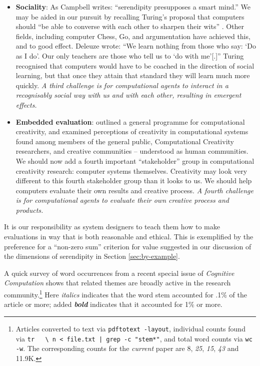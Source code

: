 \begin{itemize}
\item \textbf{Sociality}: As Campbell \citeyear{campbell} writes:
  ``serendipity presupposes a smart mind.''  We may be aided in our
  pursuit by recalling Turing's proposal that computers should ``be
  able to converse with each other to sharpen their wits''
  \cite{turing-intelligent}.  Other fields, including computer Chess,
  Go, and argumentation have achieved this, and to good effect.
  Deleuze \citeyear[p. 26]{deleuze1994difference} wrote: ``We learn
  nothing from those who say: `Do as I do'. Our only teachers are
  those who tell us to `do with me'[.]''  Turing recognised that
  computers would have to be coached in the direction of social
  learning, but that once they attain that standard they will learn
  much more quickly.  \emph{A third challenge is for computational
    agents to interact in a recognisably social way with us and with
    each other, resulting in emergent effects.}
\end{itemize}

\begin{itemize}
\item \textbf{Embedded evaluation}:
   outlined a general programme
  for computational creativity, and examined perceptions of creativity
  in computational systems found among members of the general public,
  Computational Creativity researchers, and creative communities --
  understood as human communities.  We should now add a fourth
  important ``stakeholder'' group in computational creativity
  research: computer systems themselves.  Creativity may look very
  different to this fourth stakeholder group than it looks to us.  We
  should help computers evaluate their own results and creative
  process.  \emph{A fourth challenge is for computational agents to
    evaluate their own creative process and products.}
\end{itemize}

It is our responsibility as system designers to teach them how to make
evaluations in way that is both reasonable and ethical.  This is
exemplified by the preference for a ``non-zero sum'' criterion for
value suggested in our discussion of the dimensions of serendipity in
Section \ref{sec:by-example}.

A quick survey of word occurrences from a recent special issue of
\emph{Cognitive Computation} shows that related themes are broadly
active in the research community.\footnote{Articles converted to text
  via {\tt pdftotext -layout}, individual counts found via {\tt tr
    \textquotesingle~\textquotesingle~\textquotesingle\textbackslash
    n\textquotesingle~< file.txt | grep -c "stem*"}, and total word counts
  via {\tt wc -w}.  The corresponding counts for the \emph{current}
  paper are 8, \emph{25}, \emph{15}, \emph{43} and 11.9K.}  Here
\emph{italics} indicates that the word stem accounted for .1\% of the
article or more; added \textbf{\emph{bold}} indicates that it
accounted for 1\% or more.

